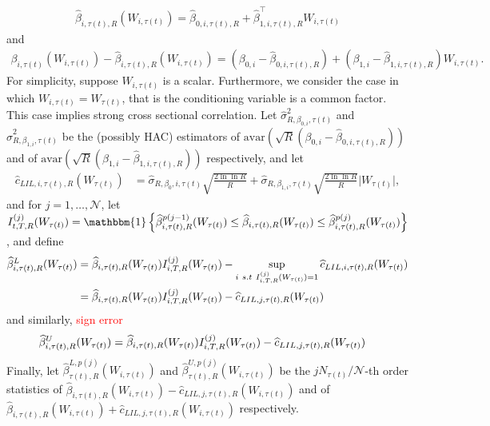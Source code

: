 \begin{align}
\widehat{\beta}_{i,\tau(t),R} (W_{i,\tau(t)}) = \widehat{\beta}_{0,i,\tau(t),R} + \widehat{\beta}_{1,i,\tau(t),R}^\top W_{i,\tau(t)}
\end{align}
and
\begin{align}
\beta_{i,\tau(t)} (W_{i,\tau(t)}) - \widehat{\beta}_{i,\tau(t),R} (W_{i,\tau(t)}) = (\beta_{0,i} - \widehat{\beta}_{0,i,\tau(t),R}) + (\beta_{1,i} - \widehat{\beta}_{1,i,\tau(t),R}) W_{i,\tau(t)}.
\end{align}
For simplicity, suppose $W_{i,\tau(t)}$ is a scalar. Furthermore, we consider the case in which $W_{i,\tau(t)} = W_{\tau(t)}$, that is the conditioning variable is a common factor. This case implies strong cross sectional correlation. Let $\widehat{\sigma}^2_{R,\beta_{0,i},\tau(t)}$ and $\widehat{\sigma}^2_{R,\beta_{1,i},\tau(t)}$ be the (possibly HAC) estimators of $\text{avar}(\sqrt{R}(\beta_{0,i} - \widehat{\beta}_{0,i,\tau(t),R}))$ and of $\text{avar}\left(\sqrt{R}(\beta_{1,i} - \widehat{\beta}_{1,i,\tau(t),R})\right)$ respectively, and let
\begin{align}
\widehat{c}_{LIL,i,\tau(t),R} (W_{\tau(t)}) &= \widehat{\sigma}_{R,\beta_{0},i,\tau(t)} \sqrt{\frac{2 \ln \ln R}{R}} + \widehat{\sigma}_{R,\beta_{1,i},\tau(t)} \sqrt{\frac{2 \ln \ln R}{R}} \lvert W_{\tau(t)} \rvert,
\end{align}
and for $j = 1, \ldots, \mathcal{N}$, let $I^{(j)}_{t,T,R}(W_{\tau(t)}) = \mathbbm{1} \left\{ \widehat{\beta}^{p(j-1)}_{i,\tau(t),R} (W_{\tau(t)}) \leq \widehat{\beta}_{i,\tau(t),R} (W_{\tau(t)}) \leq \widehat{\beta}^{p(j)}_{i,\tau(t),R} (W_{\tau(t)}) \right\}$,
and define
\begin{align}
\widehat{\beta}^{L}_{i,\tau(t),R} (W_{\tau(t)}) &= \widehat{\beta}_{i,\tau(t),R} (W_{\tau(t)}) I^{(j)}_{i,T,R} (W_{\tau(t)}) - \sup_{i \ s.t \ I^{(j)}_{i,T,R}(W_{\tau(t)}) = 1} \widehat{c}_{LIL,i,\tau(t),R} (W_{\tau(t)}) \\
&= \widehat{\beta}_{i,\tau(t),R} (W_{\tau(t)}) I^{(j)}_{i,T,R} (W_{\tau(t)}) - \widehat{c}_{LIL,j,\tau(t),R} (W_{\tau(t)}) \notag
\end{align}
and similarly, \textcolor{red}{sign error}
\begin{align}
\widehat{\beta}^{U}_{i,\tau(t),R} (W_{\tau(t)}) &= \widehat{\beta}_{i,\tau(t),R} (W_{\tau(t)}) I^{(j)}_{i,T,R} (W_{\tau(t)}) - \widehat{c}_{LIL,j,\tau(t),R} (W_{\tau(t)}) \notag
\end{align}
Finally, let $\widehat{\beta}^{L,p(j)}_{\tau(t),R} (W_{i,\tau(t)})$ and $\widehat{\beta}^{U,p(j)}_{\tau(t),R} (W_{i,\tau(t)})$ be the $j N_{\tau(t)} / \mathcal{N}$-th order statistics of $\widehat{\beta}_{i,\tau(t),R} (W_{i,\tau(t)}) - \widehat{c}_{LIL,j,\tau(t),R} (W_{i,\tau(t)})$ and of $\widehat{\beta}_{i,\tau(t),R} (W_{i,\tau(t)}) + \widehat{c}_{LIL,j,\tau(t),R} (W_{i,\tau(t)})$ respectively.

